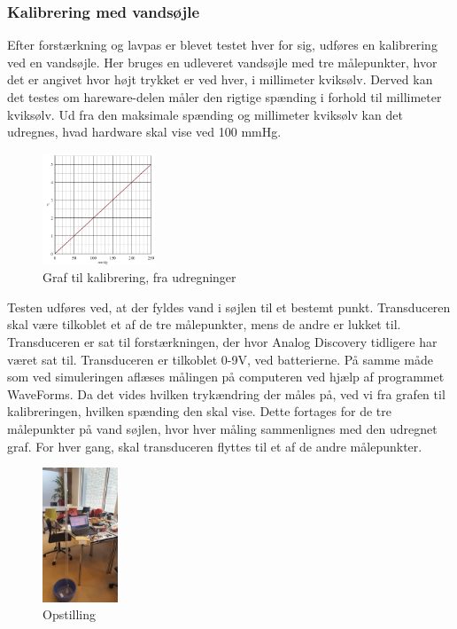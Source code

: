 \subsubsection{Kalibrering med vandsøjle}
Efter forstærkning og lavpas er blevet testet hver for sig, udføres en kalibrering ved en vandsøjle. Her bruges en udleveret vandsøjle med tre målepunkter, hvor det er angivet hvor højt trykket er ved hver, i millimeter kviksølv. Derved kan det testes om hareware-delen måler den rigtige spænding i forhold til millimeter kviksølv. Ud fra den maksimale spænding og millimeter kviksølv kan det udregnes, hvad hardware skal vise ved 100 mmHg. 
\begin{figure}[H]
	\centering
	\includegraphics[width=0.3\textwidth]{Figurer/graf_vandtest}
	\caption{Graf til kalibrering, fra udregninger}
	\label{fig:graf_vandtest}
\end{figure}
Testen udføres ved, at der fyldes vand i søjlen til et bestemt punkt. Transduceren skal være tilkoblet et af de tre målepunkter, mens de andre er lukket til. Transduceren er sat til forstærkningen, der hvor Analog Discovery tidligere har været sat til. Transduceren er tilkoblet 0-9V, ved batterierne. På samme måde som ved simuleringen aflæses målingen på computeren ved hjælp af programmet WaveForms. Da det vides hvilken trykændring der måles på, ved vi fra grafen til kalibreringen, hvilken spænding den skal vise. Dette fortages for de tre målepunkter på vand søjlen, hvor hver måling sammenlignes med den udregnet graf. For hver gang, skal transduceren flyttes til et af de andre målepunkter.  
\begin{figure}[H]
	\centering
	\includegraphics[width=0.2\textwidth]{Figurer/vandtest3}
	\caption{Opstilling}
	\label{fig:vandtest}
\end{figure} 
